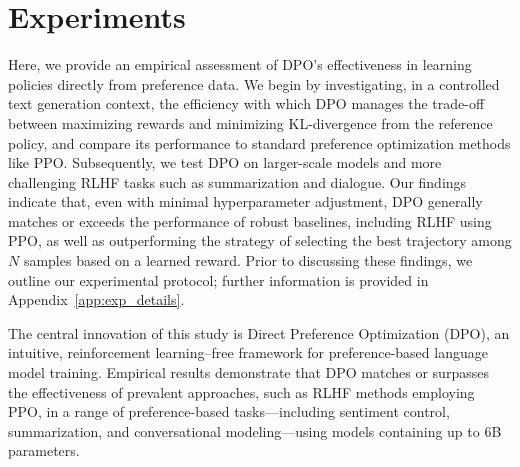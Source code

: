 \section{Experiments}
Here, we provide an empirical assessment of DPO’s effectiveness in learning policies directly from preference data. We begin by investigating, in a controlled text generation context, the efficiency with which DPO manages the trade-off between maximizing rewards and minimizing KL-divergence from the reference policy, and compare its performance to standard preference optimization methods like PPO. Subsequently, we test DPO on larger-scale models and more challenging RLHF tasks such as summarization and dialogue. Our findings indicate that, even with minimal hyperparameter adjustment, DPO generally matches or exceeds the performance of robust baselines, including RLHF using PPO, as well as outperforming the strategy of selecting the best trajectory among $N$ samples based on a learned reward. Prior to discussing these findings, we outline our experimental protocol; further information is provided in Appendix~\ref{app:exp_details}.

The central innovation of this study is Direct Preference Optimization (DPO), an intuitive, reinforcement learning–free framework for preference-based language model training. Empirical results demonstrate that DPO matches or surpasses the effectiveness of prevalent approaches, such as RLHF methods employing PPO, in a range of preference-based tasks—including sentiment control, summarization, and conversational modeling—using models containing up to 6B parameters.

